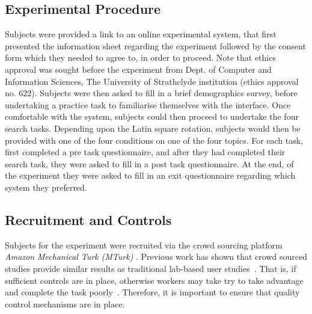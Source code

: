 
\subsection{Experimental Procedure}
Subjects were provided a link to an online experimental system, that first presented the information sheet regarding the experiment followed by the consent form which they needed to agree to, in order to proceed. Note that ethics approval was sought before the experiment from Dept. of Computer and Information Sciences, The University of Strathclyde institution (ethics approval no. 622).
Subjects were then asked to fill in a brief demographics survey, before undertaking a practice task to familiarise themselves with the interface. Once comfortable with the system, subjects could then proceed to undertake the four search tasks. Depending upon the Latin square rotation, subjects would then be provided with one of the four conditions on one of the four topics. For each task, first completed a pre task questionnaire, and after they had completed their search task, they were asked to fill in a post task questionnaire. At the end, of the experiment they were asked to fill in an exit questionnaire regarding which system they preferred.



\subsection{Recruitment and Controls}\label{sec:method:subjects}
Subjects for the experiment were recruited via the crowd sourcing platform \emph{Amazon Mechanical Turk (MTurk)} . Previous work has shown that crowd sourced studies provide similar results as traditional lab-based user studies~\cite{kelly2011remote,zuccon2013crowdsourcing}. That is, if sufficient controls are in place, otherwise workers may take try to take advantage and complete the task poorly~\cite{feild2010turkers,bota2016playing_your_cards}. Therefore, it is important to ensure that quality control mechanisms are in place. 

